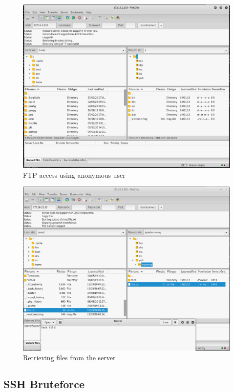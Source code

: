 \documentclass{report}
\begin{document}
\begin{figure}[!htb]
	\centering
	\includegraphics[scale=0.4]{img/ftp1.png}
	\caption{FTP access using anonymous user}
\end{figure}
\begin{figure}[!htb]
	\centering
	\includegraphics[scale=0.4]{img/ftp2.png}
	\caption{Retrieving files from the server}
\end{figure}
\pagebreak

\subsection{SSH Bruteforce}
\end{document}
